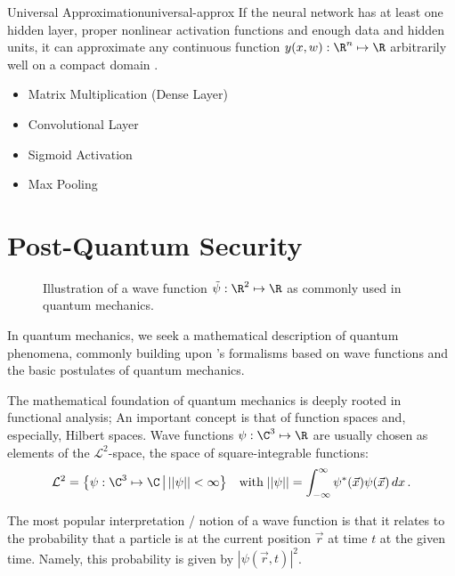 \begin{theorem}{Universal Approximation}{universal-approx}
  If the neural network has at least one hidden layer, proper nonlinear activation functions and enough data and hidden units, it can approximate any continuous function $y(x, w): \R^n \mapsto \R$ arbitrarily well on a compact domain \parencite{1989-HornikMultilayerFN}.
\end{theorem}

\begin{itemize}
  \item Matrix Multiplication (Dense Layer)
  \item Convolutional Layer
  \item Sigmoid Activation
  \item Max Pooling
\end{itemize}

\pagebreak
\section{Post-Quantum Security}
\label{sec:post-quantum-sec}
\begin{figure}[H]
  \centering
  \caption{Illustration of a wave function $\tilde{\psi}: \R^2 \mapsto \R$ as commonly used in quantum mechanics.}
\end{figure}

In quantum mechanics, we seek a mathematical description of quantum phenomena, commonly building upon 's formalisms based on wave functions and the basic postulates of quantum mechanics.

The mathematical foundation of quantum mechanics is deeply rooted in functional analysis;
An important concept is that of function spaces and, especially, Hilbert spaces.
Wave functions $\psi: \C^3 \mapsto \R$ are usually chosen as elements of the $\mathcal{L}^2$-space, the space of square-integrable functions:
$$\mathcal{L}^2 = \big\{\psi: \C^3 \mapsto \C \,\big|\, ||\psi|| < \infty\big\} \quad \text{with} \; ||\psi|| = \int_{-\infty}^{\infty} \psi^*(\vec{x}) \psi(\vec{x}) \,dx \,.$$

The most popular interpretation / notion of a wave function is that it relates to the probability that a particle is at the current position $\vec{r}$ at time $t$ at the given time.
Namely, this probability is given by $|\psi(\vec{r}, t)|^2$.


